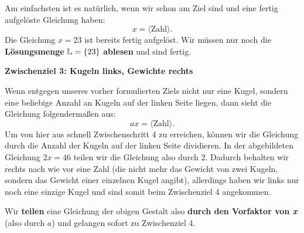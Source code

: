 \documentclass[../../main.tex]{subfiles}
\begin{document}
Am einfachsten ist es natürlich, wenn wir schon am Ziel sind und eine fertig aufgelöste Gleichung haben: 
\[x=\langle \text{Zahl} \rangle.\]
Die Gleichung $x=23$ ist bereits fertig aufgelöst. Wir müssen nur noch die \textbf{Lösungsmenge} $\mathbb{L}=\{23\}$ \textbf{ablesen} und sind fertig.

\textbf{Zwischenziel 3: Kugeln links, Gewichte rechts}


Wenn entgegen unseres vorher formulierten Ziels nicht nur eine Kugel, sondern eine beliebige Anzahl an Kugeln auf der linken Seite liegen, dann sieht die Gleichung folgendermaßen aus:
\[ax=\langle \text{Zahl} \rangle.\]
Um von hier aus schnell Zwischenschritt 4 zu erreichen, können wir die Gleichung durch die Anzahl der Kugeln auf der linken Seite dividieren. In der abgebildeten Gleichung $2x=46$ teilen wir die Gleichung also durch $2$. Dadurch behalten wir rechts nach wie vor eine Zahl (die nicht mehr das Gewicht von zwei Kugeln, sondern das Gewicht einer einzelnen Kugel angibt), allerdings haben wir links nur noch eine einzige Kugel und sind somit beim Zwischenziel 4 angekommen.

Wir \textbf{teilen} eine Gleichung der obigen Gestalt also \textbf{durch den Vorfaktor von \emph{x}} (also durch $a$) und gelangen sofort zu Zwischenziel 4.
\end{document}
